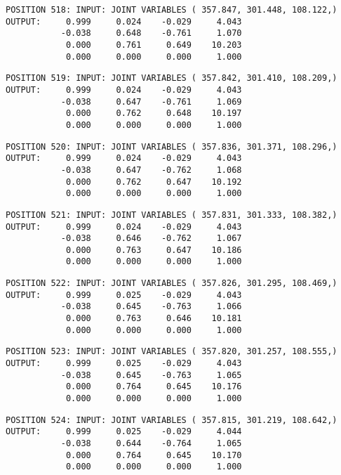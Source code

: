 \begin{verbatim}
POSITION 518: INPUT: JOINT VARIABLES ( 357.847, 301.448, 108.122,)
OUTPUT:     0.999     0.024    -0.029     4.043
           -0.038     0.648    -0.761     1.070
            0.000     0.761     0.649    10.203
            0.000     0.000     0.000     1.000
\end{verbatim} \pagebreak[1]\begin{verbatim}
POSITION 519: INPUT: JOINT VARIABLES ( 357.842, 301.410, 108.209,)
OUTPUT:     0.999     0.024    -0.029     4.043
           -0.038     0.647    -0.761     1.069
            0.000     0.762     0.648    10.197
            0.000     0.000     0.000     1.000
\end{verbatim} \pagebreak[1]\begin{verbatim}
POSITION 520: INPUT: JOINT VARIABLES ( 357.836, 301.371, 108.296,)
OUTPUT:     0.999     0.024    -0.029     4.043
           -0.038     0.647    -0.762     1.068
            0.000     0.762     0.647    10.192
            0.000     0.000     0.000     1.000
\end{verbatim} \pagebreak[1]\begin{verbatim}
POSITION 521: INPUT: JOINT VARIABLES ( 357.831, 301.333, 108.382,)
OUTPUT:     0.999     0.024    -0.029     4.043
           -0.038     0.646    -0.762     1.067
            0.000     0.763     0.647    10.186
            0.000     0.000     0.000     1.000
\end{verbatim} \pagebreak[1]\begin{verbatim}
POSITION 522: INPUT: JOINT VARIABLES ( 357.826, 301.295, 108.469,)
OUTPUT:     0.999     0.025    -0.029     4.043
           -0.038     0.645    -0.763     1.066
            0.000     0.763     0.646    10.181
            0.000     0.000     0.000     1.000
\end{verbatim} \pagebreak[1]\begin{verbatim}
POSITION 523: INPUT: JOINT VARIABLES ( 357.820, 301.257, 108.555,)
OUTPUT:     0.999     0.025    -0.029     4.043
           -0.038     0.645    -0.763     1.065
            0.000     0.764     0.645    10.176
            0.000     0.000     0.000     1.000
\end{verbatim} \pagebreak[1]\begin{verbatim}
POSITION 524: INPUT: JOINT VARIABLES ( 357.815, 301.219, 108.642,)
OUTPUT:     0.999     0.025    -0.029     4.044
           -0.038     0.644    -0.764     1.065
            0.000     0.764     0.645    10.170
            0.000     0.000     0.000     1.000
\end{verbatim} \pagebreak[1]\begin{verbatim}

\end{verbatim}
